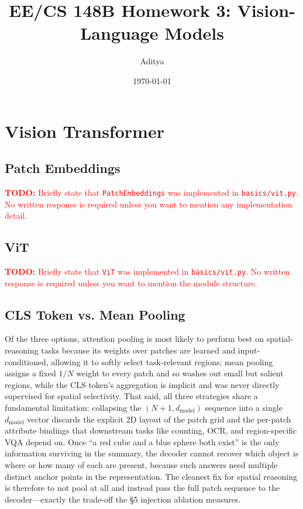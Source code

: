 \documentclass[11pt]{article}
\title{EE/CS 148B Homework 3: Vision-Language Models}
\author{Aditya}
\date{\today}
\newcommand{\TODO}[1]{\textcolor{red}{\textbf{TODO:} #1}}
\newcommand{\class}[1]{\texttt{#1}}
\begin{document}
\maketitle

\section{Vision Transformer}

\subsection{Patch Embeddings}

\TODO{Briefly state that \class{PatchEmbeddings} was implemented in \class{basics/vit.py}. No written response is required unless you want to mention any implementation detail.}

\subsection{ViT}

\TODO{Briefly state that \class{ViT} was implemented in \class{basics/vit.py}. No written response is required unless you want to mention the module structure.}

\subsection{CLS Token vs. Mean Pooling}

Of the three options, attention pooling is most likely to perform best on spatial-reasoning tasks because its weights over patches are learned and input-conditioned, allowing it to softly select task-relevant regions; mean pooling assigns a fixed $1/N$ weight to every patch and so washes out small but salient regions, while the CLS token's aggregation is implicit and was never directly supervised for spatial selectivity. That said, all three strategies share a fundamental limitation: collapsing the $(N{+}1, d_{\mathrm{model}})$ sequence into a single $d_{\mathrm{model}}$ vector discards the explicit 2D layout of the patch grid and the per-patch attribute bindings that downstream tasks like counting, OCR, and region-specific VQA depend on. Once ``a red cube and a blue sphere both exist'' is the only information surviving in the summary, the decoder cannot recover which object is where or how many of each are present, because such answers need multiple distinct anchor points in the representation. The cleanest fix for spatial reasoning is therefore to not pool at all and instead pass the full patch sequence to the decoder---exactly the trade-off the \S5 injection ablation measures.
\end{document}
